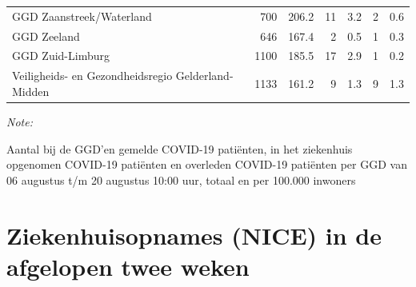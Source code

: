 \documentclass[
  english,
  man,floatsintext]{apa6}
\begin{document}
\begin{table}
\begin{threeparttable}
\begin{tabular}{lrrrrrr}
GGD Zaanstreek/Waterland & 700 & 206.2 & 11 & 3.2 & 2 & 0.6\\
GGD Zeeland & 646 & 167.4 & 2 & 0.5 & 1 & 0.3\\
GGD Zuid-Limburg & 1100 & 185.5 & 17 & 2.9 & 1 & 0.2\\
Veiligheids- en Gezondheidsregio Gelderland-Midden & 1133 & 161.2 & 9 & 1.3 & 9 & 1.3\\
\bottomrule
\end{tabular}
\begin{tablenotes}
\item \textit{Note: } 
\item Aantal bij de GGD’en gemelde COVID-19 patiënten, in het ziekenhuis opgenomen COVID-19 patiënten en overleden COVID-19 patiënten per GGD van 06 augustus t/m 20 augustus 10:00 uur, totaal en per 100.000 inwoners
\end{tablenotes}
\end{threeparttable}
\endgroup{}
\end{table}

\newpage

\hypertarget{ziekenhuisopnames-nice-in-de-afgelopen-twee-weken}{%
\section{Ziekenhuisopnames (NICE) in de afgelopen twee weken}\label{ziekenhuisopnames-nice-in-de-afgelopen-twee-weken}}
\end{document}
